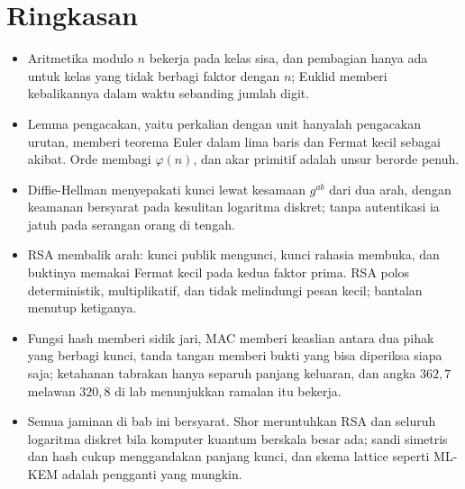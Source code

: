 \section{Ringkasan}
\begin{ringkasan}
\begin{itemize}
    \item Aritmetika modulo $n$ bekerja pada kelas sisa, dan pembagian hanya ada untuk kelas yang
        tidak berbagi faktor dengan $n$; Euklid memberi kebalikannya dalam waktu sebanding
        jumlah digit.
    \item Lemma pengacakan, yaitu perkalian dengan unit hanyalah pengacakan urutan, memberi
        teorema Euler dalam lima baris dan Fermat kecil sebagai akibat. Orde membagi
        $\varphi(n)$, dan akar primitif adalah unsur berorde penuh.
    \item Diffie-Hellman menyepakati kunci lewat kesamaan $g^{ab}$ dari dua arah, dengan keamanan
        bersyarat pada kesulitan logaritma diskret; tanpa autentikasi ia jatuh pada serangan
        orang di tengah.
    \item RSA membalik arah: kunci publik mengunci, kunci rahasia membuka, dan buktinya memakai
        Fermat kecil pada kedua faktor prima. RSA polos deterministik, multiplikatif, dan tidak
        melindungi pesan kecil; bantalan menutup ketiganya.
    \item Fungsi hash memberi sidik jari, MAC memberi keaslian antara dua pihak yang berbagi
        kunci, tanda tangan memberi bukti yang bisa diperiksa siapa saja; ketahanan tabrakan
        hanya separuh panjang keluaran, dan angka $362{,}7$ melawan $320{,}8$ di lab
        menunjukkan ramalan itu bekerja.
    \item Semua jaminan di bab ini bersyarat. Shor meruntuhkan RSA dan seluruh logaritma diskret
        bila komputer kuantum berskala besar ada; sandi simetris dan hash cukup menggandakan
        panjang kunci, dan skema lattice seperti ML-KEM adalah pengganti yang mungkin.
\end{itemize}
\end{ringkasan}

